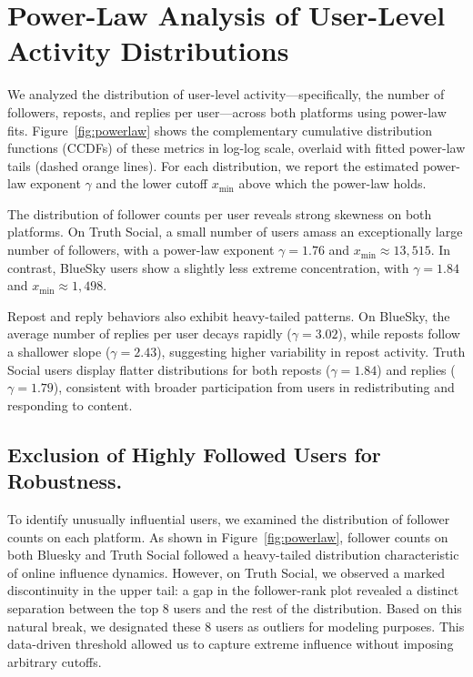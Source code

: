 \documentclass[letterpaper]{article} %
\begin{document}
\section*{Power-Law Analysis of User-Level Activity Distributions}

We analyzed the distribution of user-level activity—specifically, the number of followers, reposts, and replies per user—across both platforms using power-law fits. Figure~\ref{fig:powerlaw} shows the complementary cumulative distribution functions (CCDFs) of these metrics in log-log scale, overlaid with fitted power-law tails (dashed orange lines). For each distribution, we report the estimated power-law exponent $\gamma$ and the lower cutoff $x_{\min}$ above which the power-law holds.

The distribution of follower counts per user reveals strong skewness on both platforms. On Truth Social, a small number of users amass an exceptionally large number of followers, with a power-law exponent $\gamma = 1.76$ and $x_{\min} \approx 13{,}515$. In contrast, BlueSky users show a slightly less extreme concentration, with $\gamma = 1.84$ and $x_{\min} \approx 1{,}498$.

Repost and reply behaviors also exhibit heavy-tailed patterns. On BlueSky, the average number of replies per user decays rapidly ($\gamma = 3.02$), while reposts follow a shallower slope ($\gamma = 2.43$), suggesting higher variability in repost activity. Truth Social users display flatter distributions for both reposts ($\gamma = 1.84$) and replies ($\gamma = 1.79$), consistent with broader participation from users in redistributing and responding to content.

\subsection*{Exclusion of Highly Followed Users for Robustness.}
To identify unusually influential users, we examined the distribution of follower counts on each platform. As shown in Figure~\ref{fig:powerlaw}, follower counts on both Bluesky and Truth Social followed a heavy-tailed distribution characteristic of online influence dynamics. However, on Truth Social, we observed a marked discontinuity in the upper tail: a gap in the follower-rank plot revealed a distinct separation between the top 8 users and the rest of the distribution. Based on this natural break, we designated these 8 users as outliers for modeling purposes. This data-driven threshold allowed us to capture extreme influence without imposing arbitrary cutoffs.
\end{document}
